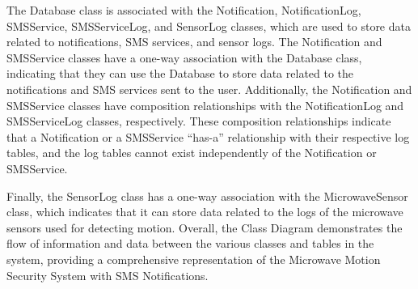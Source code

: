 The Database class is associated with the Notification, NotificationLog, SMSService,
SMSServiceLog, and SensorLog classes, which are used to store data related to
notifications, SMS services, and sensor logs. %
The Notification and SMSService classes have a one-way association with the Database class, indicating that they
can use the Database to store data related to the notifications and SMS services
sent to the user. %
Additionally, the Notification and SMSService classes have composition
relationships with the NotificationLog and SMSServiceLog classes, respectively. %
These composition relationships indicate that a Notification or a SMSService ``has-a''
relationship with their respective log tables, and the log tables cannot exist
independently of the Notification or SMSService. %

Finally, the SensorLog class has a one-way association with the MicrowaveSensor class,
which indicates that it can store data related to the logs of the microwave sensors
used for detecting motion. %
Overall, the Class Diagram demonstrates the flow of information and data between the various classes and tables in the system, providing a
comprehensive representation of the Microwave Motion Security System with
SMS Notifications. %



